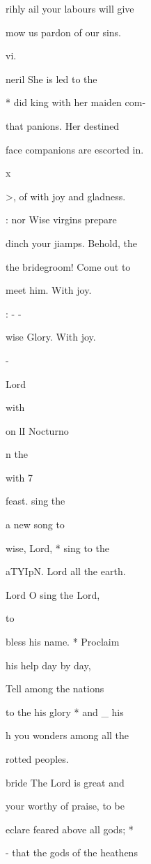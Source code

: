 \documentclass{breviary}
\begin{document}
\begin{brevbody}
\blackrule
rihly ail your labours will give

mow us pardon of our sins.

\begin{rubricpar}
\resp{} vi.

\end{rubricpar}
neril She is led to the

* did king with her maiden com-

that panions. Her destined

face companions are escorted in.

\begin{rubricpar}
x

\end{rubricpar}
>, of with joy and gladness.

\vers{} : nor Wise virgins prepare

dinch your jiamps. Behold, the

the bridegroom! Come out to

meet him. With joy.

: - -

wise Glory. With joy.

-

Lord

with

\resp{} on lI Nocturno

n the

with 7

feast. sing the

a new song to

wise, Lord, * sing to the

aTYIpN. Lord all the earth.

Lord O sing the Lord,

to

bless his name. * Proclaim

his help day by day,

Tell among the nations

to the his glory * and \_ his

h you wonders among all the

rotted peoples.

bride The Lord is great and

your worthy of praise, to be

eclare feared above all gods; *

- that the gods of the heathens


\end{brevbody}
\end{document}
